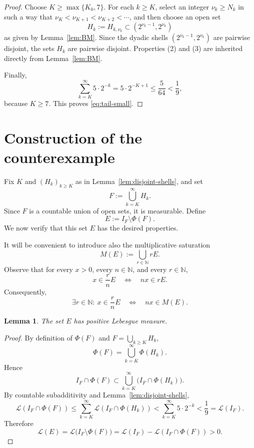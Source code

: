 \documentclass[11pt]{article}
\newtheorem{lemma}[theorem]{Lemma}
\theoremstyle{remark}
\newcommand{\N}{\mathbb{N}}
\newcommand{\Leb}{\mathcal{L}}
\begin{document}
\begin{proof}
  Choose $K\ge \max\{K_0,7\}$. For each $k\ge K$, select an integer $\nu_k\ge N_k$ in such a way that $\nu_K<\nu_{K+1}<\nu_{K+2}<\cdots$, and then choose an open set
  \[
    H_k:=H_{k,\nu_k}\subset (2^{\nu_k-1},2^{\nu_k})
  \]
  as given by Lemma~\ref{lem:BM}. Since the dyadic shells $(2^{\nu_k-1},2^{\nu_k})$ are pairwise disjoint, the sets $H_k$ are pairwise disjoint. Properties (2) and (3) are inherited directly from Lemma~\ref{lem:BM}.

  Finally,
  \[
    \sum_{k=K}^{\infty} 5\cdot 2^{-k}=5\cdot 2^{-K+1}\le \frac{5}{64}<\frac19,
  \]
  because $K\ge 7$. This proves \eqref{eq:tail-small}.
\end{proof}

\section{Construction of the counterexample}

Fix $K$ and $(H_k)_{k\ge K}$ as in Lemma~\ref{lem:disjoint-shells}, and set
\[
  F:=\bigcup_{k=K}^{\infty} H_k.
\]
Since $F$ is a countable union of open sets, it is measurable. Define
\[
  E:=I_F\setminus \Phi(F).
\]
We now verify that this set $E$ has the desired properties.

It will be convenient to introduce also the multiplicative saturation
\[
  M(E):=\bigcup_{r\in \N} rE.
\]
Observe that for every $x>0$, every $n\in \N$, and every $r\in \N$,
\begin{equation}\label{eq:basic-equiv}
  x\in \frac{r}{n}E
  \quad\Longleftrightarrow\quad
  nx\in rE.
\end{equation}
Consequently,
\begin{equation}\label{eq:ME-equiv}
  \exists r\in \N:\ x\in \frac{r}{n}E
  \quad\Longleftrightarrow\quad
  nx\in M(E).
\end{equation}

\begin{lemma}\label{lem:E-positive}
  The set $E$ has positive Lebesgue measure.
\end{lemma}

\begin{proof}
  By definition of $\Phi(F)$ and $F=\bigcup_{k\ge K}H_k$,
  \[
    \Phi(F)=\bigcup_{k=K}^{\infty}\Phi(H_k).
  \]
  Hence
  \[
    I_F\cap \Phi(F)\subset \bigcup_{k=K}^{\infty} \bigl(I_F\cap \Phi(H_k)\bigr).
  \]
  By countable subadditivity and Lemma~\ref{lem:disjoint-shells},
  \[
    \Leb(I_F\cap \Phi(F))
    \le \sum_{k=K}^{\infty} \Leb(I_F\cap \Phi(H_k))
    < \sum_{k=K}^{\infty} 5\cdot 2^{-k}
    <\frac19
    =\Leb(I_F).
  \]
  Therefore
  \[
    \Leb(E)=\Leb\bigl(I_F\setminus \Phi(F)\bigr)
    =\Leb(I_F)-\Leb(I_F\cap \Phi(F))>0.
  \]
\end{proof}
\end{document}
